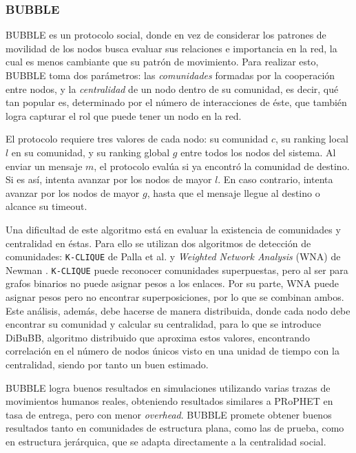 \subsubsection{BUBBLE}
BUBBLE \cite{bubble} es un protocolo social, donde en vez de considerar los patrones de movilidad de los nodos busca evaluar sus relaciones e importancia en la red, la cual es menos cambiante que su patrón de movimiento. Para realizar esto, BUBBLE toma dos parámetros: las \emph{comunidades} formadas por la cooperación entre nodos, y la \emph{centralidad} de un nodo dentro de su comunidad, es decir, qué tan popular es, determinado por el número de interacciones de éste, que también logra capturar el rol que puede tener un nodo en la red.

El protocolo requiere tres valores de cada nodo: su comunidad $c$, su ranking local $l$ en su comunidad, y su ranking global $g$ entre todos los nodos del sistema. Al enviar un mensaje $m$, el protocolo evalúa si ya encontró la comunidad de destino. Si es así, intenta avanzar por los nodos de mayor $l$. En caso contrario, intenta avanzar por los nodos de mayor $g$, hasta que el mensaje llegue al destino o alcance su timeout. 

Una dificultad de este algoritmo está en evaluar la existencia de comunidades y centralidad en éstas. Para ello se utilizan dos algoritmos de detección de comunidades: \texttt{K-CLIQUE} de Palla et al. y \emph{Weighted Network Analysis} (WNA) de Newman \cite{bubble24}. \texttt{K-CLIQUE} puede reconocer comunidades superpuestas, pero al ser para grafos binarios no puede asignar pesos a los enlaces. Por su parte, WNA puede asignar pesos pero no encontrar superposiciones, por lo que se combinan ambos. Este análisis, además, debe hacerse de manera distribuida, donde cada nodo debe encontrar su comunidad y calcular su centralidad, para lo que se introduce DiBuBB, algoritmo distribuido que aproxima estos valores, encontrando correlación en el número de nodos únicos visto en una unidad de tiempo con la centralidad, siendo por tanto un buen estimado.

BUBBLE logra buenos resultados en simulaciones utilizando varias trazas de movimientos humanos reales, obteniendo resultados similares a PRoPHET en tasa de entrega, pero con menor \emph{overhead}. BUBBLE promete obtener buenos resultados tanto en comunidades de estructura plana, como las de prueba, como en estructura jerárquica, que se adapta directamente a la centralidad social.
